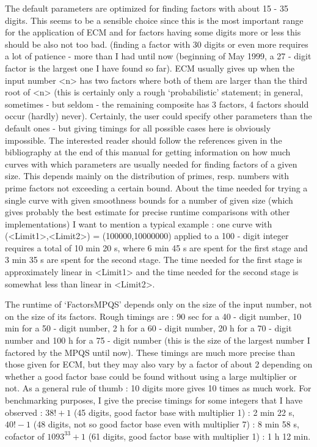 The default parameters are optimized for finding factors with about
15 - 35 digits. This seems to be a sensible choice since this is the
most important range for the application of ECM and for factors
having some digits more or less this should be also not too bad.
(finding a factor with 30 digits or even more requires a lot of
patience - more than I had until now (beginning of May 1999,
a 27 - digit factor is the largest one I have found so far).
ECM usually gives up when the input number <n> has two factors where 
both of them are larger than the third root of <n> (this is certainly
only a rough \lq probabilistic' statement; in general, sometimes 
- but seldom - the remaining composite has 3 factors, 4 factors should
occur (hardly) never). 
Certainly, the user could specify other parameters than 
the default ones - but giving timings for all possible cases here is
obviously impossible. The interested reader should follow the references
given in the bibliography at the end of this manual for getting
information on how much curves with which parameters are usually 
needed for finding factors of a given size. This depends mainly on the
distribution of primes, resp. numbers with prime factors not exceeding a
certain bound.
About the time needed for trying a single curve with given smoothness
bounds for a number of given size (which gives probably the best estimate
for precise runtime comparisons with other implementations) I want to
mention a typical example : one curve with (<Limit1>,<Limit2>) =
(100000,10000000) applied to a 100 - digit integer requires a total of
10 min 20 s, where 6 min 45 s are spent for the first stage
and 3 min 35 s are spent for the second stage.
The time needed for the first stage is approximately linear in <Limit1>
and the time needed for the second stage is somewhat less than linear
in <Limit2>.


The runtime of `FactorsMPQS' depends only on the size of the input
number, not on the size of its factors.
Rough timings are : 90 sec for a 40 - digit number, 10 min for a
50 - digit number, 2 h for a 60 - digit number, 20 h for a 70 - digit
number and 100 h for a 75 - digit number (this is the size of the
largest number I factored by the MPQS until now).
These timings are much more precise
than those given for ECM, but they may also vary by a factor of about 2
depending on whether a good factor base could be found without using
a large multiplier or not.
As a general rule of thumb : 10 digits more gives 10 times as much
work. 
For benchmarking purposes, I give the precise timings for some integers
that I have observed : $38! + 1$ (45 digits, good factor base with
multiplier 1) : 2 min 22 s, $40! - 1$ (48 digits, not so good factor
base even with multiplier 7) : 8 min 58 s, cofactor of $1093^{33}+1$
(61 digits, good factor base with multiplier 1) : 1 h 12 min.

